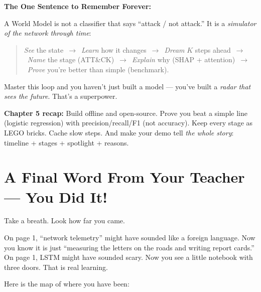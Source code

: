 \documentclass[11pt,a4paper]{article}
\begin{document}
\begin{keybox}
\textbf{The One Sentence to Remember Forever:}

A World Model is not a classifier that says ``attack / not attack.'' It is a
\emph{simulator of the network through time}:

\begin{quote}
\emph{See} the state\ $\to$\ \emph{Learn} how it changes\ $\to$\ \emph{Dream}
$K$ steps ahead\ $\to$\ \emph{Name} the stage (ATT\&CK)\ $\to$\ \emph{Explain}
why (SHAP + attention)\ $\to$\ \emph{Prove} you're better than simple
(benchmark).
\end{quote}

Master this loop and you haven't just built a model --- you've built a
\emph{radar that sees the future}. That's a superpower.
\end{keybox}

\begin{recap}
\textbf{Chapter 5 recap:} Build offline and open-source. Prove you beat a
simple line (logistic regression) with precision/recall/F1 (not accuracy).
Keep every stage as LEGO bricks. Cache slow steps. And make your demo tell
\emph{the whole story}: timeline + stages + spotlight + reasons.
\end{recap}

\newpage

\section*{A Final Word From Your Teacher --- You Did It!}

Take a breath. Look how far you came.

On page 1, ``network telemetry'' might have sounded like a foreign language.
Now you know it is just ``measuring the letters on the roads and writing
report cards.'' On page 1, LSTM might have sounded scary. Now you see a little
notebook with three doors. That is real learning.

Here is the map of where you have been:
\end{document}
